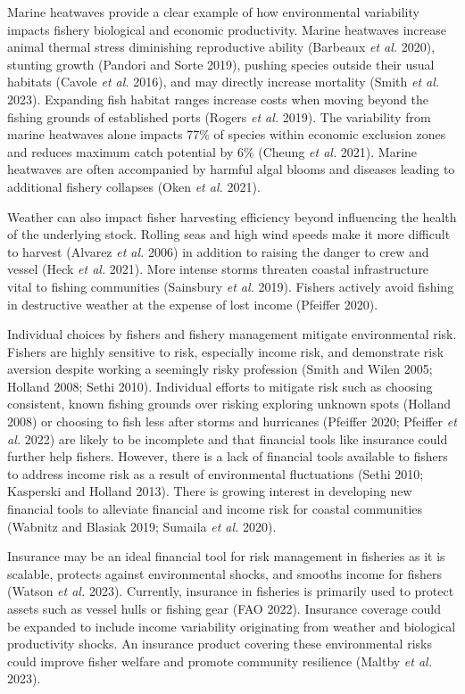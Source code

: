 \documentclass[
  letterpaper,
  DIV=11,
  numbers=noendperiod]{scrartcl}
\theoremstyle{plain}
\theoremstyle{plain}
\theoremstyle{remark}
\begin{document}
Marine heatwaves provide a clear example of how environmental
variability impacts fishery biological and economic productivity. Marine
heatwaves increase animal thermal stress diminishing reproductive
ability (Barbeaux \emph{et al.} 2020), stunting growth (Pandori and
Sorte 2019), pushing species outside their usual habitats (Cavole
\emph{et al.} 2016), and may directly increase mortality (Smith \emph{et
al.} 2023). Expanding fish habitat ranges increase costs when moving
beyond the fishing grounds of established ports (Rogers \emph{et al.}
2019). The variability from marine heatwaves alone impacts 77\% of
species within economic exclusion zones and reduces maximum catch
potential by 6\% (Cheung \emph{et al.} 2021). Marine heatwaves are often
accompanied by harmful algal blooms and diseases leading to additional
fishery collapses (Oken \emph{et al.} 2021).

Weather can also impact fisher harvesting efficiency beyond influencing
the health of the underlying stock. Rolling seas and high wind speeds
make it more difficult to harvest (Alvarez \emph{et al.} 2006) in
addition to raising the danger to crew and vessel (Heck \emph{et al.}
2021). More intense storms threaten coastal infrastructure vital to
fishing communities (Sainsbury \emph{et al.} 2019). Fishers actively
avoid fishing in destructive weather at the expense of lost income
(Pfeiffer 2020).

Individual choices by fishers and fishery management mitigate
environmental risk. Fishers are highly sensitive to risk, especially
income risk, and demonstrate risk aversion despite working a seemingly
risky profession (Smith and Wilen 2005; Holland 2008; Sethi 2010).
Individual efforts to mitigate risk such as choosing consistent, known
fishing grounds over risking exploring unknown spots (Holland 2008) or
choosing to fish less after storms and hurricanes (Pfeiffer 2020;
Pfeiffer \emph{et al.} 2022) are likely to be incomplete and that
financial tools like insurance could further help fishers. However,
there is a lack of financial tools available to fishers to address
income risk as a result of environmental fluctuations (Sethi 2010;
Kasperski and Holland 2013). There is growing interest in developing new
financial tools to alleviate financial and income risk for coastal
communities (Wabnitz and Blasiak 2019; Sumaila \emph{et al.} 2020).

Insurance may be an ideal financial tool for risk management in
fisheries as it is scalable, protects against environmental shocks, and
smooths income for fishers (Watson \emph{et al.} 2023). Currently,
insurance in fisheries is primarily used to protect assets such as
vessel hulls or fishing gear (FAO 2022). Insurance coverage could be
expanded to include income variability originating from weather and
biological productivity shocks. An insurance product covering these
environmental risks could improve fisher welfare and promote community
resilience (Maltby \emph{et al.} 2023).
\end{document}

